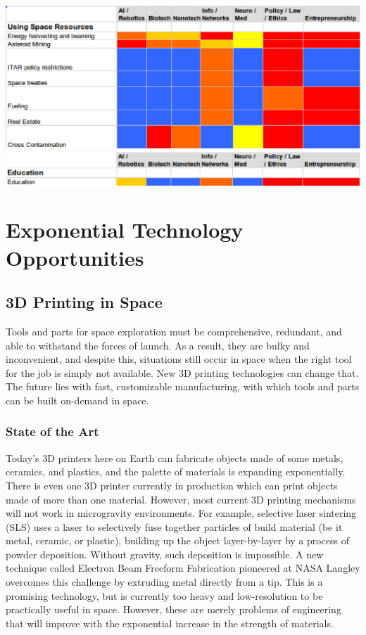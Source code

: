 \documentclass[letter,11pt]{article}
\begin{document}
\includegraphics[width=\textwidth]{hm_usr.eps}
\includegraphics[width=\textwidth]{hm_e.eps}

\section{Exponential Technology Opportunities}

\subsection{3D Printing in Space}

Tools and parts for space exploration must be comprehensive, redundant,
and able to withstand the forces of launch. As a result, they are bulky
and inconvenient, and despite this, situations still occur in space when
the right tool for the job is simply not available. New 3D printing
technologies can change that. The future lies with fast, customizable
manufacturing, with which tools and parts can be built on-demand in space.

\subsubsection{State of the Art}

Today's 3D printers here on Earth can fabricate objects made of some metals,
ceramics, and plastics, and the palette of materials is expanding
exponentially.  There is even one 3D printer currently in production which can
print objects made of more than one material. However, most current 3D printing
mechanisms will not work in microgravity environments. For example, selective
laser sintering (SLS) uses a laser to selectively fuse together particles of
build material (be it metal, ceramic, or plastic), building up the object
layer-by-layer by a process of powder deposition. Without gravity, such
deposition is impossible. A new technique called Electron Beam Freeform
Fabrication \cite{Taminger2006} pioneered at NASA Langley overcomes this
challenge by extruding metal directly from a tip. This is a promising technology,
but is currently too heavy and low-resolution to be practically useful in space.
However, these are merely problems of engineering that will improve with the
exponential increase in the strength of materials.
\end{document}
